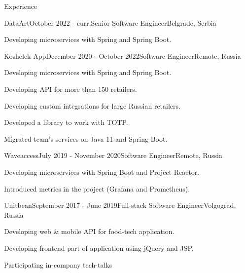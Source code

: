\documentclass{resume} %
\begin{document}
\begin{rSection}{Experience}

\begin{rSubsection}{DataArt}{October 2022 - curr.}{Senior Software Engineer}{Belgrade, Serbia}
\item Developing microservices with Spring and Spring Boot.
\end{rSubsection}

\begin{rSubsection}{Koshelek App}{December 2020 - October 2022}{Software Engineer}{Remote, Russia}
\item Developing microservices with Spring and Spring Boot.
\item Developing API for more than 150 retailers.
\item Developing custom integrations for large Russian retailers.
\item Developed a library to work with TOTP.
\item Migrated team's services on Java 11 and Spring Boot.
\end{rSubsection}


\begin{rSubsection}{Waveaccess}{July 2019 - November 2020}{Software Engineer}{Remote, Russia}
\item Developing microservices with Spring Boot and Project Reactor.
\item Introduced metrics in the project (Grafana and Prometheus).
\end{rSubsection}


\begin{rSubsection}{Unitbean}{September 2017 - June 2019}{Full-stack Software Engineer}{Volgograd, Russia}
\item Developing web \& mobile API for food-tech application.
\item Developing frontend part of application using jQuery and JSP.
\item Participating in-company tech-talks
\end{rSubsection}

\end{rSection}





\end{document}
